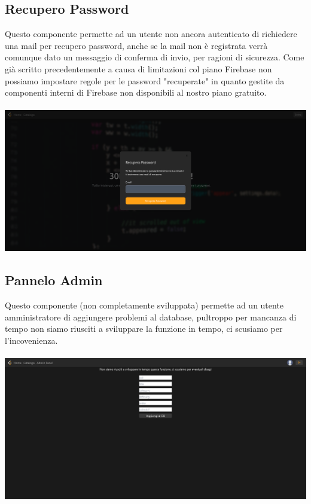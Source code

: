 \documentclass[11pt, a4paper]{article}
\theoremstyle{definition}
\begin{document}
\subsection{Recupero Password}
Questo componente permette ad un utente non ancora autenticato di richiedere una mail per recupero password, anche se la mail non è registrata verrà comunque dato un messaggio di conferma di invio, per ragioni di sicurezza. Come già scritto precedentemente
a causa di limitazioni col piano Firebase non possiamo impostare regole per le password "recuperate" in quanto gestite da componenti interni di Firebase non disponibili al nostro piano gratuito.\\\\
\includegraphics[width=\textwidth]{materiale/sito/Recupero Pw.png}
\newpage
\subsection{Pannelo Admin}
Questo componente (non completamente sviluppata) permette ad un utente amministratore di aggiungere problemi al database, pultroppo per mancanza di tempo non siamo riusciti a sviluppare la funzione in tempo, ci scusiamo per l'incovenienza.\\\\
\includegraphics[width=\textwidth]{materiale/sito/Pannello Admin.png}
\newpage
\end{document}
